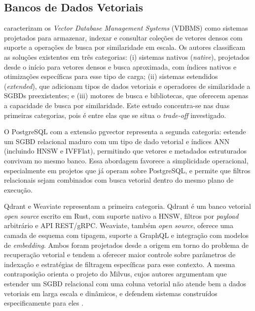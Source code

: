 \subsection{Bancos de Dados Vetoriais}

 caracterizam os \textit{Vector Database Management Systems} (VDBMS) como sistemas projetados para armazenar, indexar e consultar coleções de vetores densos com suporte a operações de busca por similaridade em escala. Os autores classificam as soluções existentes em três categorias: (i) sistemas nativos (\textit{native}), projetados desde o início para vetores densos e busca aproximada, com índices nativos e otimizações específicas para esse tipo de carga; (ii) sistemas estendidos (\textit{extended}), que adicionam tipos de dados vetoriais e operadores de similaridade a SGBDs preexistentes; e (iii) motores de busca e bibliotecas, que oferecem apenas a capacidade de busca por similaridade. Este estudo concentra-se nas duas primeiras categorias, pois é entre elas que se situa o \textit{trade-off} investigado.

O PostgreSQL com a extensão pgvector representa a segunda categoria: estende um SGBD relacional maduro com um tipo de dado vetorial e índices ANN (incluindo HNSW e IVFFlat), permitindo que vetores e metadados estruturados convivam no mesmo banco. Essa abordagem favorece a simplicidade operacional, especialmente em projetos que já operam sobre PostgreSQL, e permite que filtros relacionais sejam combinados com busca vetorial dentro do mesmo plano de execução.

Qdrant e Weaviate representam a primeira categoria. Qdrant é um banco vetorial \textit{open source} escrito em Rust, com suporte nativo a HNSW, filtros por \textit{payload} arbitrário e API REST/gRPC. Weaviate, também \textit{open source}, oferece uma camada de esquema com tipagem, suporte a GraphQL e integração com modelos de \textit{embedding}. Ambos foram projetados desde a origem em torno do problema de recuperação vetorial e tendem a oferecer maior controle sobre parâmetros de indexação e estratégias de filtragem específicas para esse contexto. A mesma contraposição orienta o projeto do Milvus, cujos autores argumentam que estender um SGBD relacional com uma coluna vetorial não atende bem a dados vetoriais em larga escala e dinâmicos, e defendem sistemas construídos especificamente para eles \cite{wang2021milvus}.

